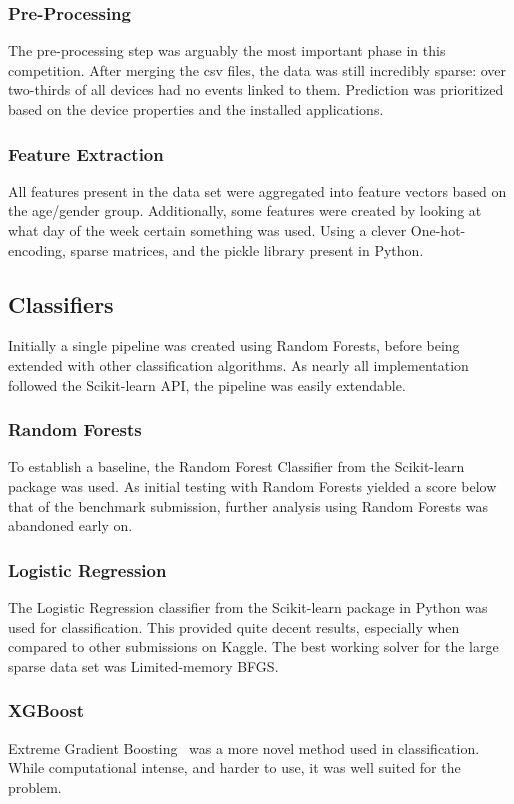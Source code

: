 \documentclass[runningheads,a4paper]{llncs}
\begin{document}
\subsubsection{Pre-Processing}
The pre-processing step was arguably the most important phase in this competition. After merging the csv files, the data was still incredibly sparse: over two-thirds of all devices had no events linked to them. Prediction was prioritized based on the device properties and the installed applications.
\subsubsection{Feature Extraction}
All features present in the data set were aggregated into feature vectors based on the age/gender group. Additionally, some features were created by looking at what day of the week certain something was used. Using a clever One-hot-encoding, sparse matrices, and the pickle library present in Python. 
\subsection{Classifiers}
Initially a single pipeline was created using Random Forests, before being extended with other classification algorithms. As nearly all implementation followed the Scikit-learn API, the pipeline was easily extendable.
\subsubsection{Random Forests}
To establish a baseline, the Random Forest Classifier from the Scikit-learn package was used. As initial testing with Random Forests yielded a score below that of the benchmark submission, further analysis using Random Forests was abandoned early on.
\subsubsection{Logistic Regression}
The Logistic Regression classifier from the Scikit-learn package in Python was used for classification. This provided quite decent results, especially when compared to other submissions on Kaggle. The best working solver for the large sparse data set was Limited-memory BFGS. 
\subsubsection{XGBoost}
Extreme Gradient Boosting~\cite{CT2015} was a more novel method used in classification. While computational intense, and harder to use, it was well suited for the problem. \medskip
\end{document}
